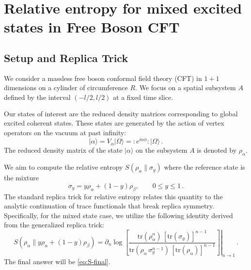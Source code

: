 \documentclass[11pt]{article}
\newcommand{\tr}{\mathrm{tr}}
\begin{document}
\section{Relative entropy for mixed excited states in Free Boson CFT}

\subsection*{Setup and Replica Trick}

We consider a massless free boson conformal field theory (CFT) in $1+1$ dimensions on a cylinder of circumference $R$. We focus on a spatial subsystem $A$ defined by the interval $(-l/2, l/2)$ at a fixed time slice.

Our states of interest are the reduced density matrices corresponding to global excited coherent states. These states are generated by the action of vertex operators on the vacuum at past infinity:
\begin{equation}
|\alpha\rangle = V_{\alpha}|\Omega\rangle = :e^{i\alpha\phi}:|\Omega\rangle\,.
\end{equation}
The reduced density matrix of the state $|\alpha\rangle$ on the subsystem $A$ is denoted by $\rho_\alpha$.

We aim to compute the relative entropy $S(\rho_\alpha \| \sigma_y)$ where the reference state is the mixture
\begin{equation}
\sigma_y = y\rho_{\alpha} +(1-y)\rho_{\beta},\qquad 0\leq y\leq 1\,.
\end{equation}
The standard replica trick for relative entropy relates this quantity to the analytic continuation of trace functionals that break replica symmetry. Specifically, for the mixed state case, we utilize the following identity derived from the generalized replica trick:
\begin{equation}
S\left(\rho_\alpha \Big\| y\rho_\alpha+(1-y)\rho_\beta\right)
=
\left.
\partial_{n} \log \left[
\frac{\tr(\rho_\alpha^{n}) \,[\tr(\sigma_y)]^{n-1}}
{\tr(\rho_\alpha\,\sigma_y^{n-1}) \,[\tr(\rho_\alpha)]^{n-1}}
\right]\right|_{n\to 1}\,.
\label{eq:replica-identity}
\end{equation}
The final answer will be \eqref{eq:S-final}.
\end{document}
